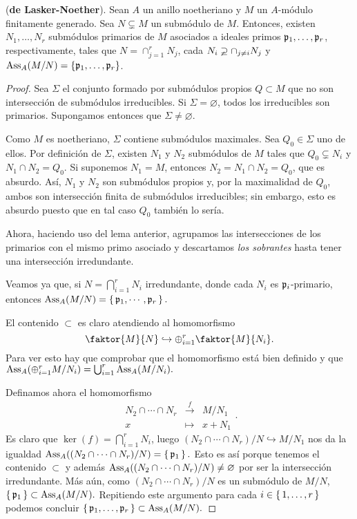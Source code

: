 \documentclass[../main.tex]{subfiles}
\begin{document}
\begin{theorem} (\textbf{de Lasker-Noether}).
Sean $A$ un anillo noetheriano y $M$ un $A$-módulo finitamente generado. Sea $N\varsubsetneq M$ un submódulo de $M$. Entonces, existen $N_1,\dots,N_r$ submódulos primarios de $M$ asociados a ideales primos $\mathfrak{p}_1,\dots,\mathfrak{p}_r$, respectivamente, tales que $N=\cap_{j=1}^rN_j$, cada $N_i\varsupsetneq\cap_{j\neq i}N_j$ y $\text{Ass}_A(M/N)=\{\mathfrak{p}_1,\dots,\mathfrak{p}_r\}$.
\end{theorem}

\begin{proof}
Sea $\Sigma$ el conjunto formado por submódulos propios $Q\subset M$ que no son intersección de submódulos irreducibles. Si $\Sigma=\varnothing$, todos los irreducibles son primarios. Supongamos entonces que $\Sigma\neq\varnothing.$

Como $M$ es noetheriano, $\Sigma$ contiene submódulos maximales. Sea $Q_0\in\Sigma$ uno de ellos. Por definición de $\Sigma$, existen $N_1$ y $N_2$ submódulos de $M$ tales que $Q_0\subsetneq N_i$ y $N_1\cap N_2=Q_0.$ Si suponemos $N_1=M$, entonces $N_2=N_1\cap N_2=Q_0$, que es absurdo. Así, $N_1$ y $N_2$ son submódulos propios y, por la maximalidad de $Q_0$, ambos son intersección finita de submódulos irreducibles; sin embargo, esto es absurdo puesto que en tal caso $Q_0$ también lo sería.

Ahora, haciendo uso del lema anterior, agrupamos las intersecciones de los primarios con el mismo primo asociado y descartamos \textit{los sobrantes} hasta tener una intersección irredundante.

Veamos ya que, si $N=\bigcap_{i=1}^rN_i$ irredundante, donde cada $N_i$ es $\mathfrak{p}_i$-primario, entonces $\text{Ass}_A(M/N)=\set{\mathfrak{p}_1,\cdots,\mathfrak{p}_r}.$

El contenido $\subset$ es claro atendiendo al homomorfismo
$$\faktor{M}{N}\hookrightarrow\oplus_{i=1}^r\faktor{M}{N_i}.$$
Para ver esto hay que comprobar que el homomorfismo está bien definido y que $\text{Ass}_A(\oplus_{i=1}^rM/{N_i})=\bigcup_{i=1}^r\text{Ass}_A(M/{N_i}).$

Definamos ahora el homomorfismo
$$\begin{array}{rcl}
    N_2\cap\cdots\cap N_r&\overset{f}{\longrightarrow}&M/N_1\\
    x&\longmapsto&x+N_1
\end{array}.$$
Es claro que $\ker(f)=\bigcap_{i=1}^r N_i$, luego $(N_2\cap\cdots\cap N_r)/N\hookrightarrow M/{N_1}$ nos da la igualdad $\text{Ass}_A((N_2\cap\cdots\cap N_r)/N)=\set{\mathfrak{p}_1}.$ Esto es así porque tenemos el contenido $\subset$ y además $\text{Ass}_A((N_2\cap\cdots\cap N_r)/N)\neq\varnothing$ por ser la intersección irredundante. Más aún, como $(N_2\cap\cdots\cap N_r)/N$ es un submódulo de $M/N$, $\set{\mathfrak{p}_1}\subset\text{Ass}_A(M/N).$ Repitiendo este argumento para cada $i\in\set{1,\dots,r}$ podemos concluir $\set{\mathfrak{p}_1,\dots,\mathfrak{p}_r}\subset\text{Ass}_A(M/N).$
\end{proof}
\end{document}

